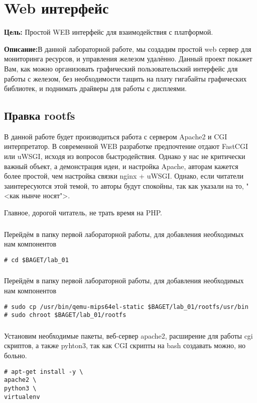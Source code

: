\chapter{Web интерфейс}
\textbf{Цель:} Простой WEB интерфейс для взаимодействия с платформой.

\vspace{5mm}
\textbf{Описание:}В данной лабораторной работе, мы создадим простой web сервер для мониторинга ресурсов, и управления железом удалённо. Данный проект покажет Вам, как можно организовать графический пользовательский интерфейс для работы с железом, без необходимости тащить на плату гигабайты графических библиотек, и поднимать драйверы для работы с дисплеями.  

\section{Правка rootfs}

В данной работе будет производиться работа с сервером Apache2 и CGI интерпретатор. В современной WEB разработке предпочтение отдают FastCGI или uWSGI, исходя из вопросов быстродействия. Однако у нас не критически важный объект, а демонстрация идеи, и настройка Apache, авторам кажется более простой, чем настройка связки nginx + uWSGI. Однако, если читатели заинтересуются этой темой, то авторы будут спокойны, так как указали на то, "<как нынче носят">. 

Главное, дорогой читатель, не трать время на PHP.    

\subsection{}Перейдём в папку первой лабораторной работы, для добавления необходимых нам компонентов
\begin{lstlisting}[style=bash]
# cd $BAGET/lab_01
\end{lstlisting}

\subsection{}Перейдём в папку первой лабораторной работы, для добавления необходимых нам компонентов
\begin{lstlisting}[style=bash]
# sudo cp /usr/bin/qemu-mips64el-static $BAGET/lab_01/rootfs/usr/bin
# sudo chroot $BAGET/lab_01/rootfs
\end{lstlisting}

\subsection{}Установим необходимые пакеты, веб-сервер apache2, расширение для работы cgi скриптов, а также pyhton3, так как CGI скрипты на bash создавать можно, но больно.
\begin{lstlisting}[style=bash]
# apt-get install -y \
apache2 \
python3 \
virtualenv
\end{lstlisting}

